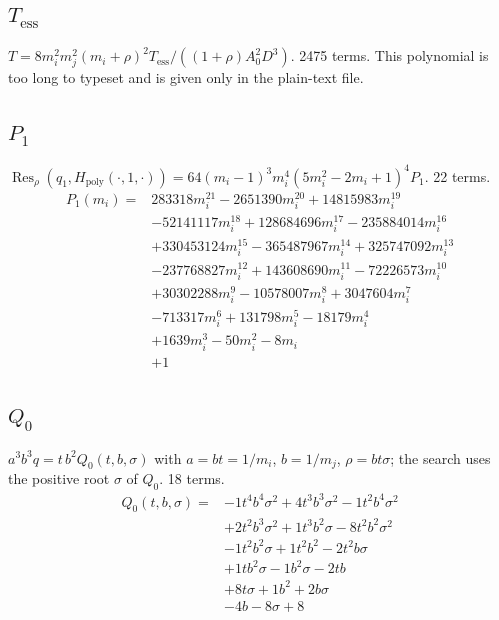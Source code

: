 \subsection*{$T_{\mathrm{ess}}$}
$T=8m_i^2m_j^2(m_i+\rho)^2T_{\mathrm{ess}}/((1+\rho)A_0^2D^3)$. 2475 terms.
This polynomial is too long to typeset and is given only in the plain-text file.

\subsection*{$P_1$}
$\operatorname{Res}_\rho(q_1,H_{\mathrm{poly}}(\cdot,1,\cdot))=64(m_i-1)^3m_i^4(5m_i^2-2m_i+1)^4P_1$. 22 terms.
{\small
\begin{align*}
P_1(m_i)={}&283318m_i^{21}-2651390m_i^{20}+14815983m_i^{19}\\
&-52141117m_i^{18}+128684696m_i^{17}-235884014m_i^{16}\\
&+330453124m_i^{15}-365487967m_i^{14}+325747092m_i^{13}\\
&-237768827m_i^{12}+143608690m_i^{11}-72226573m_i^{10}\\
&+30302288m_i^{9}-10578007m_i^{8}+3047604m_i^{7}\\
&-713317m_i^{6}+131798m_i^{5}-18179m_i^{4}\\
&+1639m_i^{3}-50m_i^{2}-8m_i\\
&+1
\end{align*}
}

\subsection*{$Q_0$}
$a^3b^3q=t\,b^2Q_0(t,b,\sigma)$ with $a=bt=1/m_i$, $b=1/m_j$, $\rho=bt\sigma$; the search uses the positive root $\sigma$ of $Q_0$. 18 terms.
{\small
\begin{align*}
Q_0(t,b,\sigma)={}&-1t^{4}b^{4}\sigma^{2}+4t^{3}b^{3}\sigma^{2}-1t^{2}b^{4}\sigma^{2}\\
&+2t^{2}b^{3}\sigma^{2}+1t^{3}b^{2}\sigma-8t^{2}b^{2}\sigma^{2}\\
&-1t^{2}b^{2}\sigma+1t^{2}b^{2}-2t^{2}b\sigma\\
&+1tb^{2}\sigma-1b^{2}\sigma-2tb\\
&+8t\sigma+1b^{2}+2b\sigma\\
&-4b-8\sigma+8
\end{align*}
}

